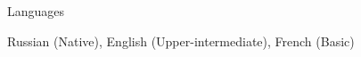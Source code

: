 \documentclass{resume} %
\begin{document}

 


\begin{rSection}{Languages}

Russian (Native), English (Upper-intermediate), French (Basic)
\end{rSection} 

\end{document}
